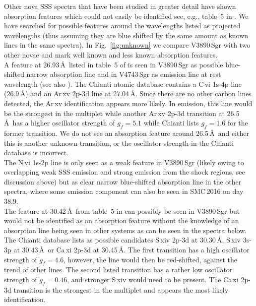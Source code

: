 \documentclass{aa}
\begin{document}
\noindent
Other nova SSS spectra that have been studied in greater detail have shown
absorption features which could not easily be identified see, e.g., table~5 in
\cite{nessv2491}. We have searched for possible features around the
wavelengths listed as projected wavelengths (thus assuming they are blue
shifted by the same amount as known lines in the same spectra). In
Fig.~\ref{fig:unknown} we compare V3890\,Sgr with two other novae and
mark well known and less known absorption features.\\

A feature at 26.93\,\AA\ listed in table~5 of \cite{nessv2491} is seen
in V3890\,Sgr as possible blue-shifted narrow absorption line and in
V4743\,Sgr as emission line at rest wavelength (see also \citealt{nesscospar}). The Chianti atomic
database \citep{chianti} contains a C\,{\sc vi} 1s-4p line (26.9\,\AA)
and an Ar\,{\sc xv} 2p-3d line at 27.04\,\AA. Since there are no other
carbon lines detected, the Ar\,{\sc xv} identification appears more likely.
In emission, this line would be the strongest in the multiplet while another
Ar\,{\sc xv} 2p-3d transition at 26.5\,\AA\ has a higher oscillator strength
of $g_f=5.1$ while Chianti lists $g_f=1.6$ for the former transition. We do
not see an absorption feature around 26.5\,\AA\ and either this is another
unknown transition, or the oscillator strength in the Chianti database is
incorrect.\\

The N\,{\sc vi} 1s-2p line is only seen as a weak feature in V3890\,Sgr
(likely owing to overlapping weak SSS
emission and strong emission from the shock regions, see discussion above)
but as clear narrow blue-shifted absorption line in the other spectra,
where some emission component can also be seen in SMC\,2016 on day 38.9.\\

The feature at 30.42\,\AA\ from table~5 in \cite{nessv2491} can possibly
be seen in V3890\,Sgr but would not be identified as an absorption feature
without the knowledge of an absorption line being seen in other systems
as can be seen in the spectra below. The Chianti database lists as possible
candidates S\,{\sc xiv} 2p-3d at 30.30\,\AA, S\,{\sc xiv} 3s-3p at
30.43\,\AA\ or Ca\,{\sc xi} 2p-3d at 30.45\,\AA. The first transition has
a high oscillator strength of $g_f=4.6$, however, the line would then be
red-shifted, against the trend of other lines. The second listed transition
has a rather low oscillator strength of $g_f=0.46$, and stronger S\,{\sc xiv}
would need to be present. The Ca\,{\sc xi} 2p-3d transition is the strongest
in the multiplet and appears the most likely identification.\\
\end{document}
